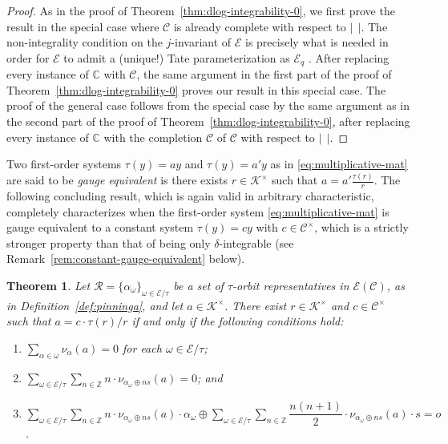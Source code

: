 \documentclass[preprint,12pt]{elsarticle}
\numberwithin{equation}{section} %
\theoremstyle{theorem}
\newtheorem{theorem}{Theorem}[section]
\theoremstyle{definition}
\newcommand{\Ca}{\mathcal{C}} %
\newcommand{\bk}{\mathcal{K}} %
\newcommand{\ec}{\mathcal{E}} %
\newcommand{\idec}{{o}} %
\newcommand{\ecq}{\ec_{q}}
\newcommand{\orbita}{{\ec/\tau}} %
\newcommand{\C}{\mathbb{C}} %
\newcommand{\Z}{\mathbb{Z}} %
\begin{document}
        \begin{proof}
            As in the proof of Theorem~\ref{thm:dlog-integrability-0}, we first prove the result in the special case where $\Ca$ is already complete with respect to $| \ \ |$. The non-integrality condition on the $j$-invariant of $\ec$ is precisely what is needed in order for $\ec$ to admit a (unique!) Tate parameterization as $\ecq$ \cite[Thm.~VII]{Roquette}. After replacing every instance of $\C$ with $\Ca$, the same argument in the first part of the proof of Theorem~\ref{thm:dlog-integrability-0} proves our result in this special case. The proof of the general case follows from the special case by the same argument as in the second part of the proof of Theorem~\ref{thm:dlog-integrability-0}, after replacing every instance of $\C$ with the completion $\boldsymbol{\Ca}$ of $\Ca$ with respect to $| \ \ |$.
        \end{proof}
        
    Two first-order systems $\tau(y)=ay$ and $\tau(y)=a'y$ as in \eqref{eq:multiplicative-mat} are said to be \emph{gauge equivalent} is there exists $r\in\bk^\times$ such that $a=a'\frac{\tau(r)}{r}$. The following concluding result, which is again valid in arbitrary characteristic, completely characterizes when the first-order system \eqref{eq:multiplicative-mat} is gauge equivalent to a constant system $\tau(y)=cy$ with $c\in\Ca^\times$, which is a strictly stronger property than that of being only $\delta$-integrable (see Remark~\ref{rem:constant-gauge-equivalent} below).



 \begin{theorem}\label{thm:constant-gauge-equivalent}
     Let $\mathcal{R}=\{\alpha_\omega\}_{\omega\in\orbita}$ be a set of $\tau$-orbit representatives in $\ec(\Ca)$, as in Definition~\ref{def:pinninga}, and let $a\in\bk^\times$. There exist $r\in\bk^\times$ and $c\in\Ca^\times$ such that $a=c\cdot\tau(r)/r$ if and only if the following conditions hold:
     \begin{enumerate}
         \item $\displaystyle\sum_{\alpha\in\omega}\nu_\alpha(a)=0$ for each $\omega\in\orbita$;
         \item $\displaystyle \sum_{\omega\in\orbita}\sum_{n\in\Z}n\cdot\nu_{\alpha_\omega\oplus ns}(a)=0$; and
         \item $\displaystyle\sum_{\omega\in\orbita}\sum_{n\in\Z}n\cdot\nu_{\alpha_\omega\oplus ns}(a)\cdot\alpha_{\omega} \oplus \displaystyle\sum_{\omega\in\orbita}\sum_{n\in\Z}\dfrac{n(n+1)}{2}\cdot \nu_{\alpha_{\omega}\oplus ns}(a)\cdot s=\idec$.
     \end{enumerate}
 \end{theorem}
\end{document}
